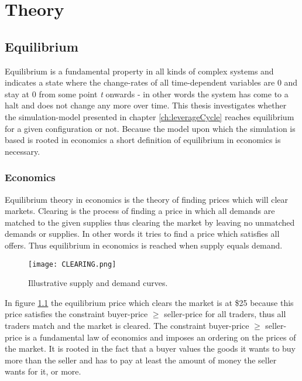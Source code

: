 \documentclass[../Bachelorarbeit.tex]{subfiles}
\begin{document}
\graphicspath{{./figures/theory/}}	%

\chapter{Theory}
\label{ch:theory}

\section{Equilibrium}
Equilibrium is a fundamental property in all kinds of complex systems and indicates a state where the change-rates of all time-dependent variables are 0 and stay at 0 from some point \textit{t} onwards - in other words the system has come to a halt and does not change any more over time. This thesis investigates whether the simulation-model presented in chapter \ref{ch:leverageCycle} reaches equilibrium for a given configuration or not. Because the model upon which the simulation is based is rooted in economics a short definition of equilibrium in economics is necessary.

\subsection{Economics}
Equilibrium theory in economics is the theory of finding prices which will clear markets. Clearing is the process of finding a price in which all demands are matched to the given supplies thus clearing the market by leaving no unmatched demands or supplies. In other words it tries to find a price which satisfies all offers. Thus equilibrium in economics is reached when supply equals demand.

\begin{figure}[H]
	\centering
  \texttt{[image: CLEARING.png]}
  	\caption{Illustrative supply and demand curves. \cite{Parsons2006}}
	\label{fig:CLEARING}
\end{figure}

In figure \ref{fig:CLEARING} the equilibrium price which clears the market is at \$25 because this price satisfies the constraint buyer-price $\geq$ seller-price for all traders, thus all traders match and the market is cleared. The constraint buyer-price $\geq$ seller-price is a fundamental law of economics and imposes an ordering on the prices of the market. It is rooted in the fact that a buyer values the goods it wants to buy more than the seller and has to pay at least the amount of money the seller wants for it, or more. 
\end{document}
